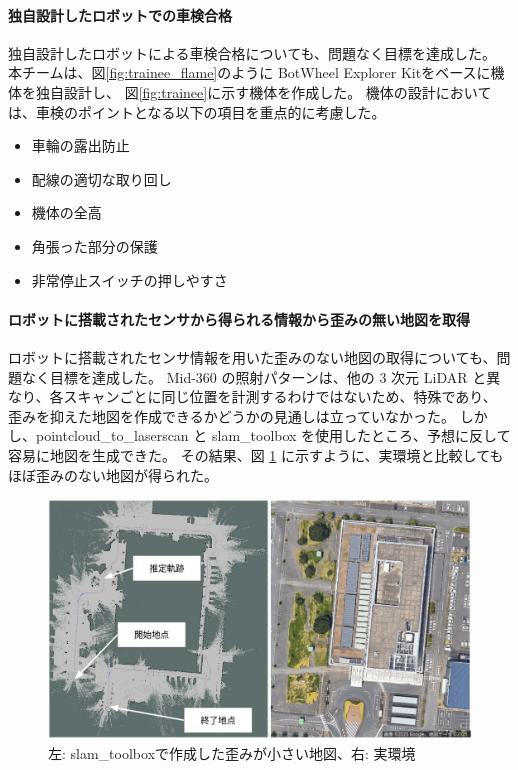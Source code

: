 \documentclass[twocolumn,9pt]{jsproceedings}
\begin{document}
\paragraph{独自設計したロボットでの車検合格}
独自設計したロボットによる車検合格についても、問題なく目標を達成した。
本チームは、図\ref{fig:trainee_flame}のように
BotWheel Explorer Kitをベースに機体を独自設計し、
図\ref{fig:trainee}に示す機体を作成した。
機体の設計においては、車検のポイントとなる以下の項目を重点的に考慮した。
\begin{itemize}
  \item 車輪の露出防止
  \item 配線の適切な取り回し
  \item 機体の全高
  \item 角張った部分の保護
  \item 非常停止スイッチの押しやすさ
\end{itemize}


\paragraph{ロボットに搭載されたセンサから得られる情報から歪みの無い地図を取得}

ロボットに搭載されたセンサ情報を用いた歪みのない地図の取得についても、問題なく目標を達成した。
Mid-360 の照射パターンは、他の 3 次元 LiDAR と異なり、各スキャンごとに同じ位置を計測するわけではないため、特殊であり、
歪みを抑えた地図を作成できるかどうかの見通しは立っていなかった。
しかし、pointcloud\_to\_laserscan と slam\_toolbox を使用したところ、予想に反して容易に地図を生成できた。
その結果、図 \ref{fig:map} に示すように、実環境と比較してもほぼ歪みのない地図が得られた。

\begin{figure}[h]
  \begin{center}
    \includegraphics[width=1.0\linewidth]{figs/map.pdf}
    \caption{左: slam\_toolboxで作成した歪みが小さい地図、右: 実環境}
    \label{fig:map}
  \end{center}
\end{figure}
\end{document}
